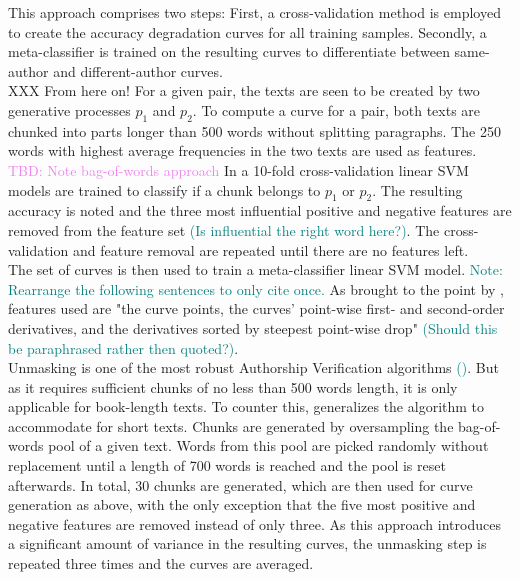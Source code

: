 This approach comprises two steps: First, a cross-validation method is employed to create the accuracy degradation curves for all training samples.
Secondly, a meta-classifier is trained on the resulting curves to differentiate between same-author and different-author curves.\\
XXX From here on!
For a given pair, the texts are seen to be created by two generative processes $p_1$ and $p_2$.
To compute a curve for a pair, both texts are chunked into parts longer than 500 words without splitting paragraphs.
The 250 words with highest average frequencies in the two texts are used as features.
\textcolor{violet}{TBD: Note bag-of-words approach}
In a 10-fold cross-validation linear SVM models are trained to classify if a chunk belongs to $p_1$ or $p_2$.
The resulting accuracy is noted and the three most influential positive and negative features are removed from the feature set \textcolor{teal}{(Is influential the right word here?)}.
The cross-validation and feature removal are repeated until there are no features left.\\
The set of curves is then used to train a meta-classifier linear SVM model.
\textcolor{teal}{Note: Rearrange the following sentences to only cite \cite{bevendorff2019unmaskingShortTexts} once.}
As brought to the point by \cite{bevendorff2019unmaskingShortTexts}, features used are "the curve points, the curves' point-wise first- and second-order derivatives, and the derivatives sorted by steepest point-wise drop" \textcolor{teal}{(Should this be paraphrased rather then quoted?)}.\\
Unmasking is one of the most robust Authorship Verification algorithms \textcolor{teal}{(\cite{bevendorff2019unmaskingShortTexts})}.
But as it requires sufficient chunks of no less than 500 words length, it is only applicable for book-length texts.
To counter this, \cite{bevendorff2019unmaskingShortTexts} generalizes the algorithm to accommodate for short texts.
Chunks are generated by oversampling the bag-of-words pool of a given text.
Words from this pool are picked randomly without replacement until a length of 700 words is reached and the pool is reset afterwards.
In total, 30 chunks are generated, which are then used for curve generation as above, with the only exception that the five most positive and negative features are removed instead of only three.
As this approach introduces a significant amount of variance in the resulting curves, the unmasking step is repeated three times and the curves are averaged.
